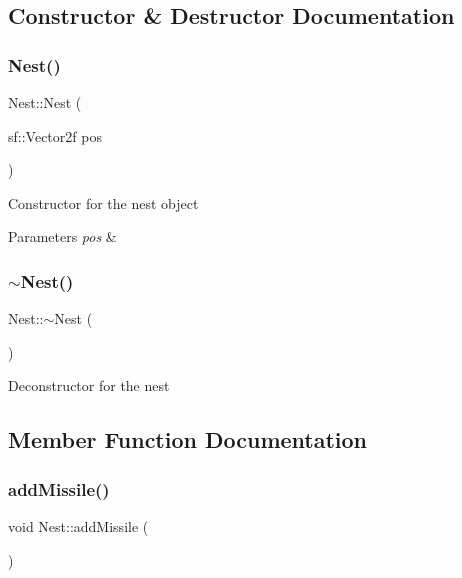\subsection{Constructor \& Destructor Documentation}
\mbox{\label{class_nest_af171ff62bfa8ef5d2ea793ef73be1625}} 
\subsubsection{\texorpdfstring{Nest()}{Nest()}}
{\footnotesize\ttfamily Nest\+::\+Nest (\begin{DoxyParamCaption}\item[{sf\+::\+Vector2f}]{pos }\end{DoxyParamCaption})}



Constructor for the nest object 


\begin{DoxyParams}{Parameters}
{\em pos} & \\
\hline
\end{DoxyParams}
\mbox{\label{class_nest_a3e879ba15acd31717b1dc9bdc87488d5}} 
\subsubsection{\texorpdfstring{$\sim$Nest()}{~Nest()}}
{\footnotesize\ttfamily Nest\+::$\sim$\+Nest (\begin{DoxyParamCaption}{ }\end{DoxyParamCaption})}



Deconstructor for the nest 



\subsection{Member Function Documentation}
\mbox{\label{class_nest_a39ab7b5112b8d8951d61fb2c7d002a36}} 
\subsubsection{\texorpdfstring{addMissile()}{addMissile()}}
{\footnotesize\ttfamily void Nest\+::add\+Missile (\begin{DoxyParamCaption}{ }\end{DoxyParamCaption})}




